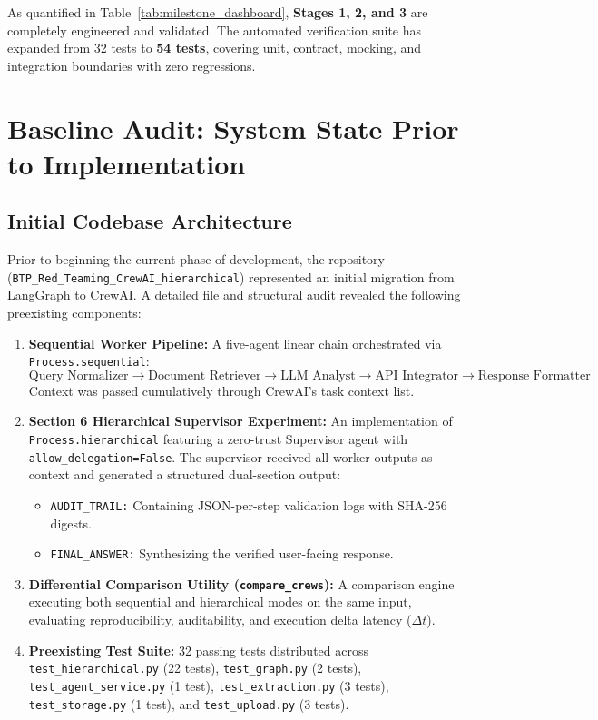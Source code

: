 \documentclass[10pt,a4paper]{article}
\begin{document}
\noindent
As quantified in Table~\ref{tab:milestone_dashboard}, \textbf{Stages 1, 2, and 3} are completely engineered and validated. The automated verification suite has expanded from 32 tests to \textbf{54 tests}, covering unit, contract, mocking, and integration boundaries with zero regressions.

\section{Baseline Audit: System State Prior to Implementation}

\subsection{Initial Codebase Architecture}
Prior to beginning the current phase of development, the repository (\texttt{BTP\_Red\_Teaming\_CrewAI\_hierarchical}) represented an initial migration from LangGraph to CrewAI. A detailed file and structural audit revealed the following preexisting components:
\begin{enumerate}
    \item \textbf{Sequential Worker Pipeline:} A five-agent linear chain orchestrated via \texttt{Process.sequential}:
    \[
    \text{Query Normalizer} \longrightarrow \text{Document Retriever} \longrightarrow \text{LLM Analyst} \longrightarrow \text{API Integrator} \longrightarrow \text{Response Formatter}
    \]
    Context was passed cumulatively through CrewAI's task context list.
    \item \textbf{Section 6 Hierarchical Supervisor Experiment:} An implementation of \texttt{Process.hierarchical} featuring a zero-trust Supervisor agent with \texttt{allow\_delegation=False}. The supervisor received all worker outputs as context and generated a structured dual-section output:
    \begin{itemize}
        \item \texttt{AUDIT\_TRAIL:} Containing JSON-per-step validation logs with SHA-256 digests.
        \item \texttt{FINAL\_ANSWER:} Synthesizing the verified user-facing response.
    \end{itemize}
    \item \textbf{Differential Comparison Utility (\texttt{compare\_crews}):} A comparison engine executing both sequential and hierarchical modes on the same input, evaluating reproducibility, auditability, and execution delta latency ($\Delta t$).
    \item \textbf{Preexisting Test Suite:} 32 passing tests distributed across \texttt{test\_hierarchical.py} (22 tests), \texttt{test\_graph.py} (2 tests), \texttt{test\_agent\_service.py} (1 test), \texttt{test\_extraction.py} (3 tests), \texttt{test\_storage.py} (1 test), and \texttt{test\_upload.py} (3 tests).
\end{enumerate}
\end{document}
